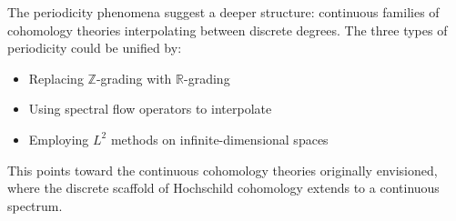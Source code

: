 The periodicity phenomena suggest a deeper structure: continuous families of cohomology theories interpolating between discrete degrees. The three types of periodicity could be unified by:
\begin{itemize}
\item Replacing $\mathbb{Z}$-grading with $\mathbb{R}$-grading
\item Using spectral flow operators to interpolate
\item Employing $L^2$ methods on infinite-dimensional spaces
\end{itemize}

This points toward the continuous cohomology theories originally envisioned, where the discrete scaffold of Hochschild cohomology extends to a continuous spectrum.
